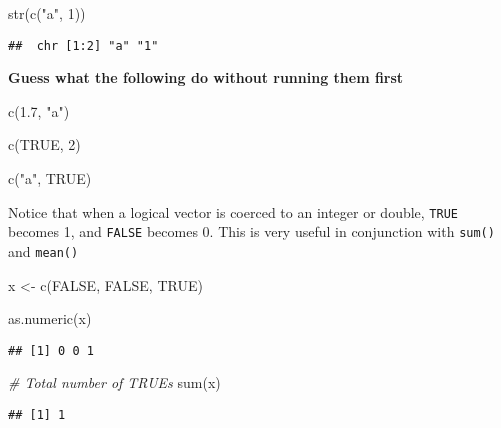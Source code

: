 \documentclass[
]{book}
\newenvironment{Shaded}{\begin{snugshade}}{\end{snugshade}}
\newcommand{\CommentTok}[1]{\textcolor[rgb]{0.56,0.35,0.01}{\textit{#1}}}
\newcommand{\ConstantTok}[1]{\textcolor[rgb]{0.00,0.00,0.00}{#1}}
\newcommand{\DecValTok}[1]{\textcolor[rgb]{0.00,0.00,0.81}{#1}}
\newcommand{\FloatTok}[1]{\textcolor[rgb]{0.00,0.00,0.81}{#1}}
\newcommand{\FunctionTok}[1]{\textcolor[rgb]{0.00,0.00,0.00}{#1}}
\newcommand{\NormalTok}[1]{#1}
\newcommand{\OtherTok}[1]{\textcolor[rgb]{0.56,0.35,0.01}{#1}}
\newcommand{\StringTok}[1]{\textcolor[rgb]{0.31,0.60,0.02}{#1}}
\begin{document}
\begin{Shaded}
\begin{Highlighting}[]
\FunctionTok{str}\NormalTok{(}\FunctionTok{c}\NormalTok{(}\StringTok{"a"}\NormalTok{, }\DecValTok{1}\NormalTok{))}
\end{Highlighting}
\end{Shaded}

\begin{verbatim}
##  chr [1:2] "a" "1"
\end{verbatim}

\textbf{Guess what the following do without running them first}

\begin{Shaded}
\begin{Highlighting}[]
\FunctionTok{c}\NormalTok{(}\FloatTok{1.7}\NormalTok{, }\StringTok{"a"}\NormalTok{)}

\FunctionTok{c}\NormalTok{(}\ConstantTok{TRUE}\NormalTok{, }\DecValTok{2}\NormalTok{)}

\FunctionTok{c}\NormalTok{(}\StringTok{"a"}\NormalTok{, }\ConstantTok{TRUE}\NormalTok{)}
\end{Highlighting}
\end{Shaded}

Notice that when a logical vector is coerced to an integer or double, \texttt{TRUE} becomes 1, and \texttt{FALSE} becomes 0. This is very useful in conjunction with \texttt{sum()} and \texttt{mean()}

\begin{Shaded}
\begin{Highlighting}[]
\NormalTok{x }\OtherTok{\textless{}{-}} \FunctionTok{c}\NormalTok{(}\ConstantTok{FALSE}\NormalTok{, }\ConstantTok{FALSE}\NormalTok{, }\ConstantTok{TRUE}\NormalTok{)}

\FunctionTok{as.numeric}\NormalTok{(x)}
\end{Highlighting}
\end{Shaded}

\begin{verbatim}
## [1] 0 0 1
\end{verbatim}

\begin{Shaded}
\begin{Highlighting}[]
\CommentTok{\# Total number of TRUEs}
\FunctionTok{sum}\NormalTok{(x)}
\end{Highlighting}
\end{Shaded}

\begin{verbatim}
## [1] 1
\end{verbatim}
\end{document}
